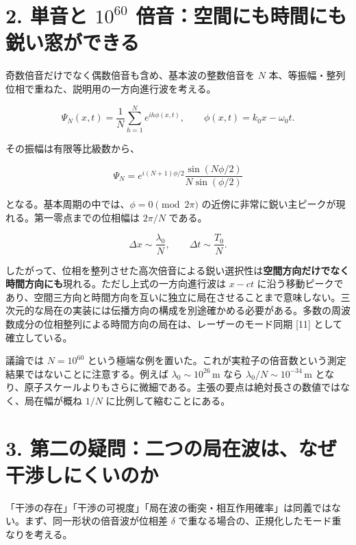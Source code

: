 \documentclass[
  a4paper,
]{ltjsarticle}
\begin{document}
\section{\texorpdfstring{2. 単音と \(10^{60}\)
倍音：空間にも時間にも鋭い窓ができる}{2. 単音と 10\^{}\{60\} 倍音：空間にも時間にも鋭い窓ができる}}\label{ux5358ux97f3ux3068-1060-ux500dux97f3ux7a7aux9593ux306bux3082ux6642ux9593ux306bux3082ux92edux3044ux7a93ux304cux3067ux304dux308b}

奇数倍音だけでなく偶数倍音も含め、基本波の整数倍音を \(N\)
本、等振幅・整列位相で重ねた、説明用の一方向進行波を考える。

\[
\Psi_N(x,t)=\frac1N\sum_{h=1}^{N}e^{ih\phi(x,t)},
\qquad \phi(x,t)=k_0x-\omega_0t.
\]

その振幅は有限等比級数から、

\[
\Psi_N=e^{i(N+1)\phi/2}
\frac{\sin(N\phi/2)}{N\sin(\phi/2)}
\]

となる。基本周期の中では、\(\phi=0\pmod{2\pi}\)
の近傍に非常に鋭い主ピークが現れる。第一零点までの位相幅は \(2\pi/N\)
である。

\[
\Delta x\sim\frac{\lambda_0}{N},
\qquad
\Delta t\sim\frac{T_0}{N}.
\]

したがって、位相を整列させた高次倍音による鋭い選択性は\textbf{空間方向だけでなく時間方向にも}現れる。ただし上式の一方向進行波は
\(x-ct\)
に沿う移動ピークであり、空間三方向と時間方向を互いに独立に局在させることまで意味しない。三次元的な局在の実装には伝播方向の構成を別途確かめる必要がある。多数の周波数成分の位相整列による時間方向の局在は、レーザーのモード同期
{[}11{]} として確立している。

議論では \(N=10^{60}\)
という極端な例を置いた。これが実粒子の倍音数という測定結果ではないことに注意する。例えば
\(\lambda_0\sim10^{26}\,\mathrm m\) なら
\(\lambda_0/N\sim10^{-34}\,\mathrm m\)
となり、原子スケールよりもさらに微細である。主張の要点は絶対長さの数値ではなく、局在幅が概ね
\(1/N\) に比例して縮むことにある。

\section{3.
第二の疑問：二つの局在波は、なぜ干渉しにくいのか}\label{ux7b2cux4e8cux306eux7591ux554fux4e8cux3064ux306eux5c40ux5728ux6ce2ux306fux306aux305cux5e72ux6e09ux3057ux306bux304fux3044ux306eux304b}

「干渉の存在」「干渉の可視度」「局在波の衝突・相互作用確率」は同義ではない。まず、同一形状の倍音波が位相差
\(\delta\) で重なる場合の、正規化したモード重なりを考える。
\end{document}
